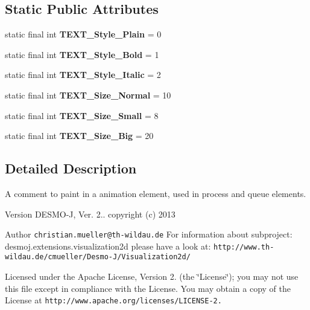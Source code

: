 \subsection*{Static Public Attributes}
\begin{DoxyCompactItemize}
\item 
static final int {\bfseries T\-E\-X\-T\-\_\-\-Style\-\_\-\-Plain} = 0\label{classdesmoj_1_1extensions_1_1visualization2d_1_1animation_1_1_comment_aa557fc230ba5afbbbbe99b04961e1bbe}

\item 
static final int {\bfseries T\-E\-X\-T\-\_\-\-Style\-\_\-\-Bold} = 1\label{classdesmoj_1_1extensions_1_1visualization2d_1_1animation_1_1_comment_a3f83a377aa1b431d4bdf53ce221dfe90}

\item 
static final int {\bfseries T\-E\-X\-T\-\_\-\-Style\-\_\-\-Italic} = 2\label{classdesmoj_1_1extensions_1_1visualization2d_1_1animation_1_1_comment_a82704a3e0731362cf7c87659349ddb2e}

\item 
static final int {\bfseries T\-E\-X\-T\-\_\-\-Size\-\_\-\-Normal} = 10\label{classdesmoj_1_1extensions_1_1visualization2d_1_1animation_1_1_comment_addd4f4a96bef1f8801c1a099db1ab463}

\item 
static final int {\bfseries T\-E\-X\-T\-\_\-\-Size\-\_\-\-Small} = 8\label{classdesmoj_1_1extensions_1_1visualization2d_1_1animation_1_1_comment_abb8064a4a858b0bddc8f3954dcd4cec1}

\item 
static final int {\bfseries T\-E\-X\-T\-\_\-\-Size\-\_\-\-Big} = 20\label{classdesmoj_1_1extensions_1_1visualization2d_1_1animation_1_1_comment_a6f341d574792742ee65bfed37a3c7d42}

\end{DoxyCompactItemize}


\subsection{Detailed Description}
A comment to paint in a animation element, used in process and queue elements.

\begin{DoxyVersion}{Version}
D\-E\-S\-M\-O-\/\-J, Ver. 2.. copyright (c) 2013 
\end{DoxyVersion}
\begin{DoxyAuthor}{Author}
{\tt christian.\-mueller@th-\/wildau.\-de} For information about subproject\-: desmoj.\-extensions.\-visualization2d please have a look at\-: {\tt http\-://www.\-th-\/wildau.\-de/cmueller/\-Desmo-\/\-J/\-Visualization2d/}
\end{DoxyAuthor}
Licensed under the Apache License, Version 2. (the \char`\"{}\-License\char`\"{}); you may not use this file except in compliance with the License. You may obtain a copy of the License at {\tt http\-://www.\-apache.\-org/licenses/\-L\-I\-C\-E\-N\-S\-E-\/2.}

